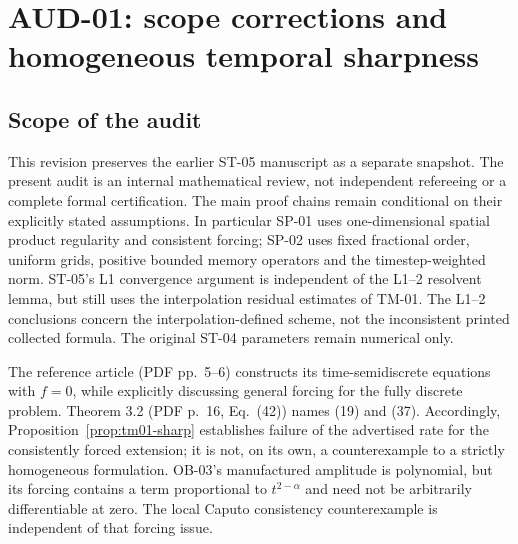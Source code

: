 \section{AUD-01: scope corrections and homogeneous temporal sharpness}
\label{sec:aud01}

\subsection{Scope of the audit}
This revision preserves the earlier ST-05 manuscript as a separate snapshot. The present audit is an internal mathematical review, not independent refereeing or a complete formal certification. The main proof chains remain conditional on their explicitly stated assumptions. In particular SP-01 uses one-dimensional spatial product regularity and consistent forcing; SP-02 uses fixed fractional order, uniform grids, positive bounded memory operators and the timestep-weighted norm. ST-05's L1 convergence argument is independent of the L1--2 resolvent lemma, but still uses the interpolation residual estimates of TM-01. The L1--2 conclusions concern the interpolation-defined scheme, not the inconsistent printed collected formula. The original ST-04 parameters remain numerical only.

The reference article (PDF pp.~5--6) constructs its time-semidiscrete equations with $f=0$, while explicitly discussing general forcing for the fully discrete problem. Theorem 3.2 (PDF p.~16, Eq.~(42)) names (19) and (37). Accordingly, Proposition~\ref{prop:tm01-sharp} establishes failure of the advertised rate for the consistently forced extension; it is not, on its own, a counterexample to a strictly homogeneous formulation. OB-03's manufactured amplitude is polynomial, but its forcing contains a term proportional to $t^{2-\alpha}$ and need not be arbitrarily differentiable at zero. The local Caputo consistency counterexample is independent of that forcing issue.

